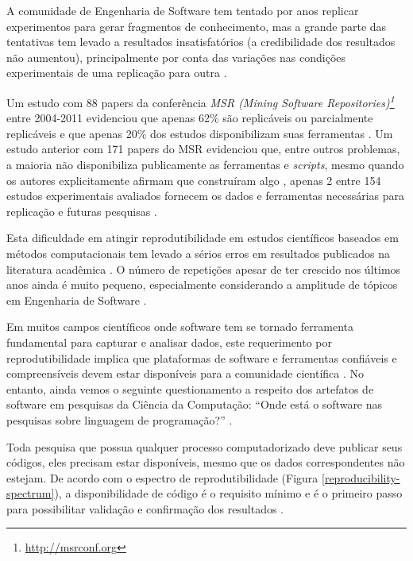A comunidade de Engenharia de Software tem tentado por anos replicar
experimentos para gerar fragmentos de conhecimento, mas a grande parte
das tentativas tem levado a resultados insatisfatórios (a
credibilidade dos resultados não aumentou), principalmente por conta das
variações nas condições experimentais de uma replicação para outra
\cite{juristo_using_2009}.

Um estudo com 88 papers da conferência {\it MSR (Mining Software
Repositories)\footnote{\url{http://msrconf.org}}} entre 2004-2011 evidenciou
que apenas 62\% são replicáveis ou parcialmente replicáveis e que apenas 20\%
dos estudos disponibilizam suas ferramentas \cite{amann2015software}. Um estudo
anterior com 171 papers do MSR evidenciou que, entre outros problemas, a
maioria não disponibiliza publicamente as ferramentas e {\it scripts}, mesmo
quando os autores explicitamente afirmam que construíram algo
\cite{robles2010replicating}, apenas 2 entre 154 estudos experimentais
avaliados fornecem os dados e ferramentas necessárias para replicação e
futuras pesquisas \cite{barr_shoulders_2010}.

Esta dificuldade em atingir reprodutibilidade
em estudos científicos baseados em métodos computacionais tem
levado a sérios erros em resultados publicados na literatura acadêmica
\cite{hinsen_activepapers_2015}. O número de repetições apesar de ter crescido nos últimos
anos ainda é muito pequeno, especialmente
considerando a amplitude de tópicos em Engenharia de Software
\cite{silva_replication_2011, kitchenham_evidence-based_2015}.

Em muitos campos científicos onde software tem se tornado ferramenta
fundamental para capturar e analisar dados, este requerimento por
reprodutibilidade implica que plataformas de software e ferramentas confiáveis
e compreensíveis devem estar disponíveis para a comunidade científica
\cite{mccormick_itk_2014}. No entanto, ainda vemos o seguinte questionamento a
respeito dos artefatos de software em pesquisas da Ciência da Computação:
``Onde está o software nas pesquisas sobre linguagem de programação?''
\cite{krishnamurthi_real_2015}.

Toda pesquisa que possua qualquer processo computadorizado deve publicar seus
códigos, eles precisam estar disponíveis, mesmo que os dados correspondentes
não estejam. De acordo com o espectro de reprodutibilidade (Figura
\ref{reproducibility-spectrum}), a disponibilidade de código é o requisito
mínimo e é o primeiro passo para possibilitar validação e confirmação dos
resultados \cite{peng2011reproducible}.

